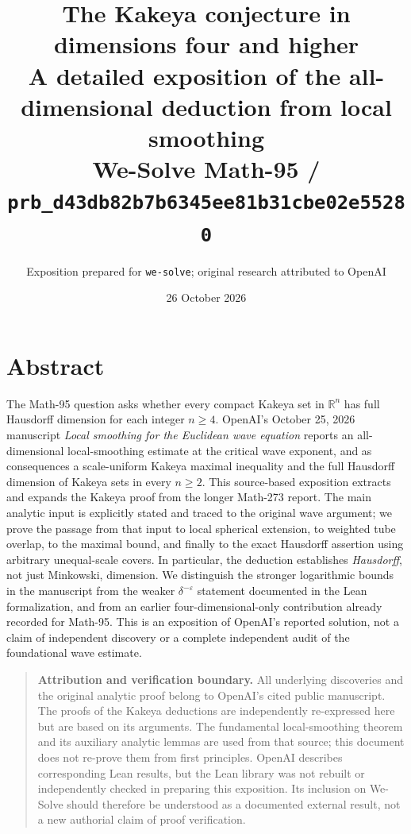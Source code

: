 \documentclass[11pt,a4paper]{article}
\title{The Kakeya conjecture in dimensions four and higher\\
\large A detailed exposition of the all-dimensional deduction from local smoothing\\
 We-Solve Math-95 / \texttt{prb\_d43db82b7b6345ee81b31cbe02e55280}}
\author{Exposition prepared for \texttt{we-solve}; original research attributed to OpenAI}
\date{26 October 2026}
\numberwithin{equation}{section}
\theoremstyle{definition}
\theoremstyle{remark}
\newcommand{\R}{\mathbb R}
\newcommand{\eps}{\varepsilon}
\begin{document}
\maketitle
\section*{Abstract}
The Math-95 question asks whether every compact Kakeya set in
$\R^n$ has full Hausdorff dimension for each integer $n\ge4$.
OpenAI's October 25, 2026 manuscript \emph{Local smoothing for the
Euclidean wave equation} reports an all-dimensional local-smoothing
estimate at the critical wave exponent, and as consequences a
scale-uniform Kakeya maximal inequality and the full Hausdorff
dimension of Kakeya sets in every $n\ge2$. This source-based exposition
extracts and expands the Kakeya proof from the longer Math-273 report.
The main analytic input is explicitly stated and traced to the original
wave argument; we prove the passage from that input to local spherical
extension, to weighted tube overlap, to the maximal bound, and finally
to the exact Hausdorff assertion using arbitrary unequal-scale covers.
In particular, the deduction establishes \emph{Hausdorff}, not just
Minkowski, dimension. We distinguish the stronger logarithmic bounds in
the manuscript from the weaker $\delta^{-\eps}$ statement documented
in the Lean formalization, and from an earlier four-dimensional-only
contribution already recorded for Math-95. This is an exposition of
OpenAI's reported solution, not a claim of independent discovery or a
complete independent audit of the foundational wave estimate.

\begin{quote}\small
\noindent\textbf{Attribution and verification boundary.}
All underlying discoveries and the original analytic proof belong to
OpenAI's cited public manuscript. The proofs of the Kakeya deductions
are independently re-expressed here but are based on its arguments.
The fundamental local-smoothing theorem and its auxiliary analytic
lemmas are used from that source; this document does not re-prove them
from first principles. OpenAI describes corresponding Lean results,
but the Lean library was not rebuilt or independently checked in
preparing this exposition. Its inclusion on We-Solve should therefore
be understood as a documented external result, not a new authorial
claim of proof verification.
\end{quote}
\end{document}
